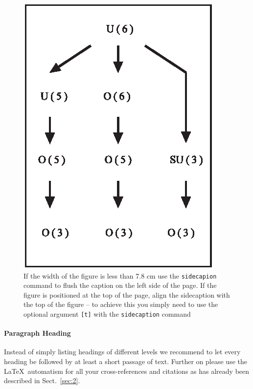\documentclass[graybox]{svmult}
\begin{document}
%
\begin{figure}[b]
\sidecaption
\includegraphics[scale=.65]{figure}
%
%
\caption{If the width of the figure is less than 7.8 cm use the \texttt{sidecapion} command to flush the caption on the left side of the page. If the figure is positioned at the top of the page, align the sidecaption with the top of the figure -- to achieve this you simply need to use the optional argument \texttt{[t]} with the \texttt{sidecaption} command}
\label{fig:1}       %
\end{figure}


\paragraph{Paragraph Heading} %
Instead of simply listing headings of different levels we recommend to let every heading be followed by at least a short passage of text.  Further on please use the \LaTeX\ automatism for all your cross-references and citations as has already been described in Sect.~\ref{sec:2}.
\end{document}
